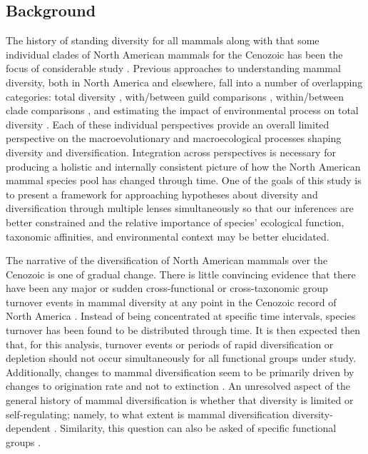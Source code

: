 \documentclass[12pt,letterpaper]{article}
\begin{document}
\subsection*{Background}

The history of standing diversity for all mammals along with that some individual clades of North American mammals for the Cenozoic has been the focus of considerable study \citep{Alroy2009,Alroy1996a,Janis1993b,Alroy2000g,Figueirido2012,Pires2015a,Fraser2015a,Smits2015b,Quental2013,Slater2015c,Silvestro2015b,Badgley2013,Blois2009,Janis1993c}. Previous approaches to understanding mammal diversity, both in North America and elsewhere, fall into a number of overlapping categories: total diversity \citep{Alroy2000g,Alroy1996a,Figueirido2012,Liow2008}, with/between guild comparisons \citep{Janis2004,Janis2000,Jernvall2004,Janis1993c,Pires2015a,Janis2008a}, within/between clade comparisons \citep{Quental2013,Slater2015c,Silvestro2015b,Fraser2015a,Cantalapiedra2017}, and estimating the impact of environmental process on total diversity \citep{Blois2009,Janis1993c,Janis1993b,Fraser2015a,Eronen2015,Badgley2013,Badgley2017,Alroy2000g}. Each of these individual perspectives provide an overall limited perspective on the macroevolutionary and macroecological processes shaping diversity and diversification. Integration across perspectives is necessary for producing a holistic and internally consistent picture of how the North American mammal species pool has changed through time. One of the goals of this study is to present a framework for approaching hypotheses about diversity and diversification through multiple lenses simultaneously so that our inferences are better constrained and the relative importance of species' ecological function, taxonomic affinities, and environmental context may be better elucidated.

The narrative of the diversification of North American mammals over the Cenozoic is one of gradual change. There is little convincing evidence that there have been any major or sudden cross-functional or cross-taxonomic group turnover events in mammal diversity at any point in the Cenozoic record of North America \citep{Alroy2009,Alroy1996a,Eronen2015,Janis1993b,Alroy2000g}. Instead of being concentrated at specific time intervals, species turnover has been found to be distributed through time. It is then expected then that, for this analysis, turnover events or periods of rapid diversification or depletion should not occur simultaneously for all functional groups under study. Additionally, changes to mammal diversification seem to be primarily driven by changes to origination rate and not to extinction \citep{Alroy1996a,Alroy2000g,Alroy2009}. An unresolved aspect of the general history of mammal diversification is whether that diversity is limited or self-regulating; namely, to what extent is mammal diversification diversity-dependent \citep{Alroy2009,Rabosky2015b,Harmon2015a,Rabosky2013a}. Similarity, this question can also be asked of specific functional groups \citep{Jernvall2004,Valkenburgh1999,Silvestro2015b,Quental2013}.
\end{document}

